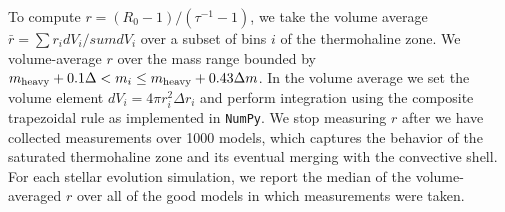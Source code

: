 To compute $r = (R_0 - 1)/(\tau^{-1} - 1)$, we take the volume average $\bar{r} = \sum r_i dV_i / sum dV_i$ over a subset of bins $i$ of the thermohaline zone.
We volume-average $r$ over the mass range bounded by $m_{\rm{heavy}} + 0.1\Delta  < m_i \leq m_{\rm heavy} + 0.43\Delta m$.
In the volume average we set the volume element $dV_i = 4\pi r_i^2 \Delta r_i$ and perform integration using the composite trapezoidal rule as implemented in \texttt{NumPy}.
We stop measuring $r$ after we have collected measurements over 1000 models, which captures the behavior of the saturated thermohaline zone and its eventual merging with the convective shell.
For each stellar evolution simulation, we report the median of the volume-averaged $r$ over all of the good models in which measurements were taken.